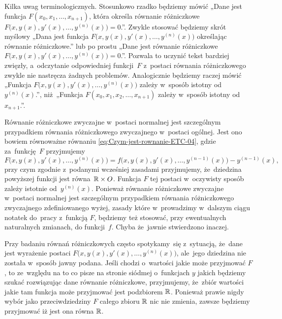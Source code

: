 \documentclass[a4paper,11pt]{article}
\numberwithin{equation}{section}
\begin{document}
Kilka uwag terminologicznych. Stosunkowo rzadko będziemy mówić
„Dane jest funkcja $F( x_{ 0 }, x_{ 1 }, \ldots, x_{ n + 1 } )$, która
określa równanie różniczkowe
$F\big( x, y( x ), y'( x ), \ldots, y^{ ( n ) }( x ) \big) = 0$.”. Zwykle
stosować będziemy skrót myślowy „Dana jest funkcja
$F\big( x, y( x ), y'( x ), \ldots, y^{ ( n ) }( x ) \big)$ określając równanie
różniczkowe.” lub po prostu „Dane jest równanie różniczkowe
$F\big( x, y( x ), y'( x ), \ldots, y^{ ( n ) }( x ) \big) = 0$.”. Pozwala
to uczynić tekst bardziej zwięzły, a~odczytanie odpowiedniej funkcji~$F$
z~postaci równania różniczkowego zwykle nie nastręcza żadnych problemów.
Analogicznie będziemy raczej mówić „Funkcja
$F\big( x, y( x ), y'( x ), \ldots, y^{ ( n ) }( x ) \big)$ zależy w~sposób
istotny od $y^{ ( n ) }( x )$.”, niż~„Funkcja
$F( x_{ 0 }, x_{ 1 }, x_{ 2 }, \ldots, x_{ n + 1 } )$ zależy w~sposób istotny
od~$x_{ n + 1 }$.”.

Równanie różniczkowe zwyczajne w~postaci normalnej jest
szczególnym przypadkiem równania różniczkowego zwyczajnego w~postaci
ogólnej. Jest ono bowiem równoważne równaniu
\eqref{eq:Czym-jest-rownanie-ETC-04}, gdzie za~funkcję~$F$
przyjmujemy
\begin{equation}
  \label{eq:Czym-jest-rownanie-ETC-06}
  F\big( x, y( x ), y'( x ), \ldots, y^{ ( n ) }( x ) \big) =
  f\big( x, y( x ), y'( x ), \ldots, y^{ ( n - 1 ) }( x ) \big) -
  y^{ ( n - 1 ) }( x ),
\end{equation}
przy czym zgodnie z~podanymi wcześniej zasadami przyjmujemy, że~dziedzina
powyższej funkcji jest równa~$\mathbb{R} \times O$. Funkcja $F$ tej postaci w~oczywisty
sposób zależy istotnie od~$y^{ ( n ) }( x )$. Ponieważ równanie różniczkowe
zwyczajne w~postaci normalnej jest szczególnym przypadkiem równania
różniczkowego zwyczajnego zdefiniowanego wyżej, zasady które w~prowadzimy
w~dalszym ciągu notatek do~pracy z~funkcją $F$, będziemy też stosować, przy
ewentualnych naturalnych zmianach, do funkcji~$f$. Chyba że~jawnie
stwierdzono inaczej.

Przy badaniu równań różniczkowych często spotykamy~się z~sytuacją, że~dane
jest wyrażenie postaci
$F\big( x, y( x ), y'( x ), \ldots, y^{ ( n ) }( x ) \big)$,
ale~jego dziedzina nie została w~sposób jawny podana. Jeśli chodzi
o~wartości jakie może przyjmować $F$, to ze~względu na to co pisze na
stronie siódmej o~funkcjach $y$ jakich będziemy szukać rozwiązując dane
równanie różniczkowe, przyjmujemy, że~zbiór wartości jakie tam funkcja może
przyjmować jest podzbiorem $\mathbb{R}$. Ponieważ prawie nigdy wybór jako
przeciwdziedziny $F$ całego zbioru $\mathbb{R}$ nic nie zmienia, zawsze będziemy
przyjmować iż jest ona równa $\mathbb{R}$.
\end{document}
